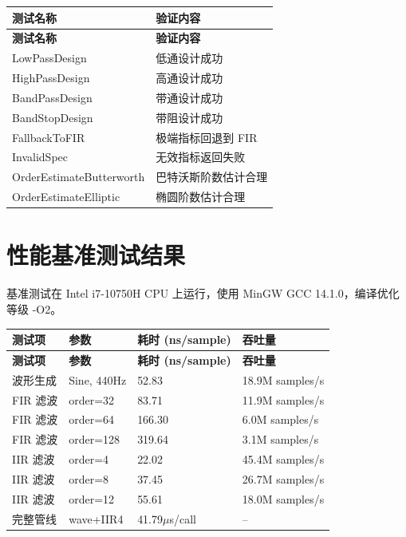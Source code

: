 ﻿\documentclass[12pt,a4paper,oneside]{ctexbook}
\begin{document}
\begin{longtable}{p{4cm}p{9cm}}
    \toprule
    \textbf{测试名称} & \textbf{验证内容} \\
    \midrule
    \endfirsthead
    \toprule
    \textbf{测试名称} & \textbf{验证内容} \\
    \midrule
    \endhead
    \bottomrule
    \endfoot
    LowPassDesign & 低通设计成功 \\
    HighPassDesign & 高通设计成功 \\
    BandPassDesign & 带通设计成功 \\
    BandStopDesign & 带阻设计成功 \\
    FallbackToFIR & 极端指标回退到 FIR \\
    InvalidSpec & 无效指标返回失败 \\
    OrderEstimateButterworth & 巴特沃斯阶数估计合理 \\
    OrderEstimateElliptic & 椭圆阶数估计合理 \\
    \bottomrule
\end{longtable}

\section{性能基准测试结果}

基准测试在 Intel i7-10750H CPU 上运行，使用 MinGW GCC 14.1.0，编译优化等级 -O2。

\begin{longtable}{p{4cm}p{3cm}p{3cm}p{3cm}}
    \toprule
    \textbf{测试项} & \textbf{参数} & \textbf{耗时 (ns/sample)} & \textbf{吞吐量} \\
    \midrule
    \endfirsthead
    \toprule
    \textbf{测试项} & \textbf{参数} & \textbf{耗时 (ns/sample)} & \textbf{吞吐量} \\
    \midrule
    \endhead
    \bottomrule
    \endfoot
    波形生成 & Sine, 440Hz & 52.83 & 18.9M samples/s \\
    FIR 滤波 & order=32 & 83.71 & 11.9M samples/s \\
    FIR 滤波 & order=64 & 166.30 & 6.0M samples/s \\
    FIR 滤波 & order=128 & 319.64 & 3.1M samples/s \\
    IIR 滤波 & order=4 & 22.02 & 45.4M samples/s \\
    IIR 滤波 & order=8 & 37.45 & 26.7M samples/s \\
    IIR 滤波 & order=12 & 55.61 & 18.0M samples/s \\
    完整管线 & wave+IIR4 & 41.79$\mu$s/call & -- \\
    \bottomrule
\end{longtable}
\end{document}
